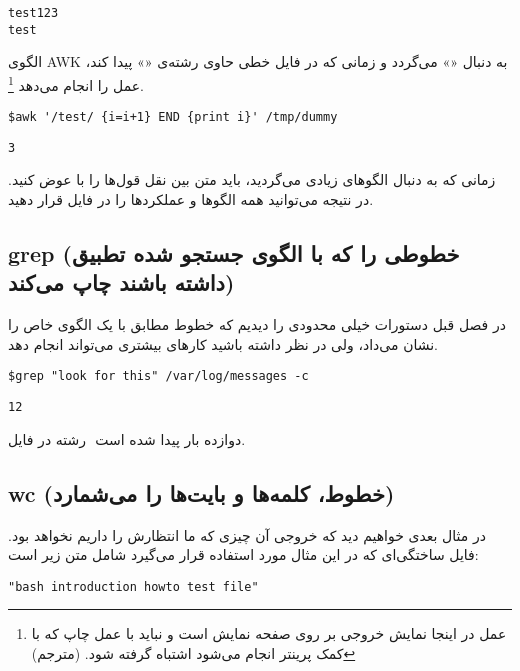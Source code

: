 \begin{latin}
\begin{lstlisting}
test123
test
\end{lstlisting}
\end{latin}
الگوی AWK به دنبال «» می‌گردد و زمانی که در فایل  خطی حاوی رشته‌ی
«» پیدا کند‌، عمل  را انجام می‌دهد
\footnote{
عمل  در اینجا نمایش خروجی بر روی صفحه نمایش است و نباید با عمل چاپ که با کمک
پرینتر انجام می‌شود اشتباه گرفته شود. (مترجم)
}.
\begin{latin}
\begin{lstlisting}
$awk '/test/ {i=i+1} END {print i}' /tmp/dummy
\end{lstlisting}
\end{latin}

\begin{latin}
\begin{lstlisting}
3
\end{lstlisting}
\end{latin}

زمانی که به دنبال الگوهای زیادی می‌گردید، باید متن بین نقل قول‌ها را با 
عوض کنید. در نتیجه می‌توانید همه الگوها و عملکردها را در فایل  قرار دهید.


\subsection*{{\codefont grep} (خطوطی را که با الگوی جستجو شده تطبیق داشته باشند چاپ می‌کند)}
در فصل قبل دستورات  خیلی محدودی را دیدیم که خطوط مطابق با یک الگوی خاص را
نشان می‌داد، ولی در نظر داشته باشید  کارهای بیشتری می‌تواند انجام دهد.
\begin{latin}
\begin{lstlisting}
$grep "look for this" /var/log/messages -c
\end{lstlisting}
\end{latin}

\begin{latin}
\begin{lstlisting}
12
\end{lstlisting}
\end{latin}

رشته  در فایل ‎ دوازده بار پیدا شده است.

\subsection*{{\codefont wc} (خطوط، کلمه‌ها و بایت‌ها را می‌شمارد)}
در مثال بعدی خواهیم دید که خروجی آن چیزی
که ما انتظارش را داریم نخواهد بود. فایل ساختگی‌ای که در این مثال مورد استفاده قرار
می‌گیرد شامل متن زیر است:
\begin{latin}
\begin{lstlisting}
"bash introduction howto test file"
\end{lstlisting}
\end{latin}

